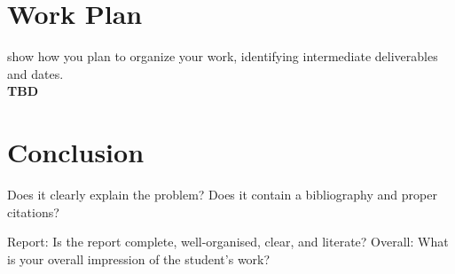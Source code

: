\documentclass{mprop}
\begin{document}
\section{Work Plan}

show how you plan to organize your work, identifying intermediate deliverables and dates.\\
\textbf{TBD}

\section{Conclusion}

Does it clearly explain the problem?
Does it contain a bibliography and proper citations?

Report: Is the report complete, well-organised, clear, and literate?
Overall: What is your overall impression of the student’s work?



\end{document}
